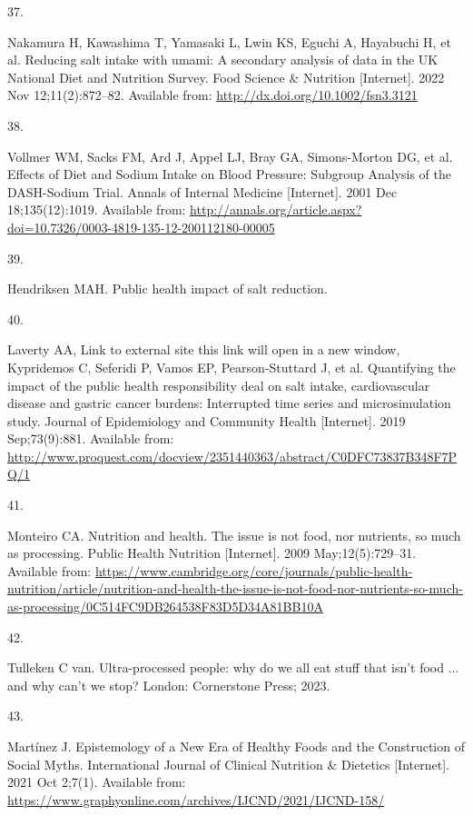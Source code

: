 \documentclass[
]{article}
\newlength{\cslhangindent}
\newlength{\csllabelwidth}
\newlength{\cslentryspacingunit} %
\newenvironment{CSLReferences}[2] %
 {%
  \setlength{\parindent}{0pt}
  \ifodd #1
  \let\oldpar\par
  \def\par{\hangindent=\cslhangindent\oldpar}
  \fi
  \setlength{\parskip}{#2\cslentryspacingunit}
 }%
 {}
\newcommand{\CSLLeftMargin}[1]{\parbox[t]{\csllabelwidth}{#1}}
\newcommand{\CSLRightInline}[1]{\parbox[t]{\linewidth - \csllabelwidth}{#1}\break}
\begin{document}
\begin{CSLReferences}{0}{0}
\leavevmode{}%
\CSLLeftMargin{37. }%
\CSLRightInline{Nakamura H, Kawashima T, Yamasaki L, Lwin KS, Eguchi A,
Hayabuchi H, et al. Reducing salt intake with umami: A secondary
analysis of data in the UK National Diet and Nutrition Survey. Food
Science \& Nutrition {[}Internet{]}. 2022 Nov 12;11(2):872--82.
Available from: \url{http://dx.doi.org/10.1002/fsn3.3121}}

\leavevmode{}%
\CSLLeftMargin{38. }%
\CSLRightInline{Vollmer WM, Sacks FM, Ard J, Appel LJ, Bray GA,
Simons-Morton DG, et al. Effects of Diet and Sodium Intake on Blood
Pressure: Subgroup Analysis of the DASH-Sodium Trial. Annals of Internal
Medicine {[}Internet{]}. 2001 Dec 18;135(12):1019. Available from:
\url{http://annals.org/article.aspx?doi=10.7326/0003-4819-135-12-200112180-00005}}

\leavevmode{}%
\CSLLeftMargin{39. }%
\CSLRightInline{Hendriksen MAH. Public health impact of salt reduction.
}

\leavevmode{}%
\CSLLeftMargin{40. }%
\CSLRightInline{Laverty AA, Link to external site this link will open in
a new window, Kypridemos C, Seferidi P, Vamos EP, Pearson-Stuttard J, et
al. Quantifying the impact of the public health responsibility deal on
salt intake, cardiovascular disease and gastric cancer burdens:
Interrupted time series and microsimulation study. Journal of
Epidemiology and Community Health {[}Internet{]}. 2019 Sep;73(9):881.
Available from:
\url{http://www.proquest.com/docview/2351440363/abstract/C0DFC73837B348F7PQ/1}}

\leavevmode{}%
\CSLLeftMargin{41. }%
\CSLRightInline{Monteiro CA. Nutrition and health. The issue is not
food, nor nutrients, so much as processing. Public Health Nutrition
{[}Internet{]}. 2009 May;12(5):729--31. Available from:
\url{https://www.cambridge.org/core/journals/public-health-nutrition/article/nutrition-and-health-the-issue-is-not-food-nor-nutrients-so-much-as-processing/0C514FC9DB264538F83D5D34A81BB10A}}

\leavevmode{}%
\CSLLeftMargin{42. }%
\CSLRightInline{Tulleken C van. Ultra-processed people: why do we all
eat stuff that isn't food ... and why can't we stop? London: Cornerstone
Press; 2023. }

\leavevmode{}%
\CSLLeftMargin{43. }%
\CSLRightInline{Martínez J. Epistemology of a New Era of Healthy Foods
and the Construction of Social Myths. International Journal of Clinical
Nutrition \& Dietetics {[}Internet{]}. 2021 Oct 2;7(1). Available from:
\url{https://www.graphyonline.com/archives/IJCND/2021/IJCND-158/}}


\end{CSLReferences}
\end{document}
